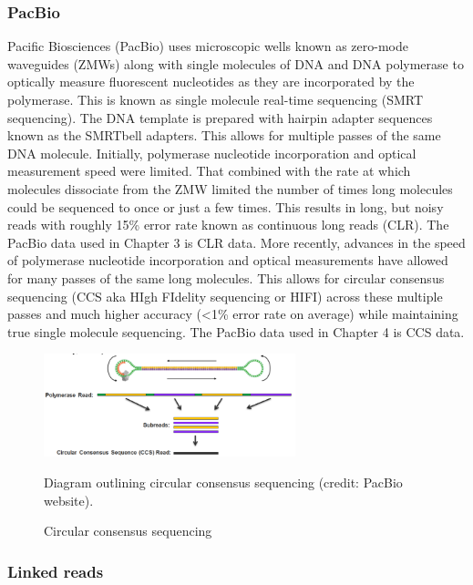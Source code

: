 \subsubsection{PacBio}

\par{
Pacific Biosciences (PacBio) uses microscopic wells known as zero-mode waveguides (ZMWs) along with single molecules of DNA and DNA polymerase to optically measure fluorescent nucleotides as they are incorporated by the polymerase. This is known as single molecule real-time sequencing (SMRT sequencing). The DNA template is prepared with hairpin adapter sequences known as the SMRTbell adapters. This allows for multiple passes of the same DNA molecule. Initially, polymerase nucleotide incorporation and optical measurement speed were limited. That combined with the rate at which molecules dissociate from the ZMW limited the number of times long molecules could be sequenced to once or just a few times. This results in long, but noisy reads with roughly 15\% error rate\cite{pacbio}\cite{blasr}\cite{clrerror} known as continuous long reads (CLR). The PacBio data used in Chapter 3 is CLR data. More recently, advances in the speed of polymerase nucleotide incorporation and optical measurements have allowed for many passes of the same long molecules. This allows for circular consensus sequencing (CCS aka HIgh FIdelity sequencing or HIFI) across these multiple passes and much higher accuracy (<1\% error rate on average) while maintaining true single molecule sequencing\cite{HIFI}. The PacBio data used in Chapter 4 is CCS data.
}

\begin{figure}[htbp!]
\caption{Circular consensus sequencing}
\label{figure:ccs}
\begin{centering}
\includegraphics[width=0.65\textwidth]{CCS.png}
\par{Diagram outlining circular consensus sequencing (credit: PacBio website).}
\end{centering}
\end{figure}

\subsubsection{Linked reads}

